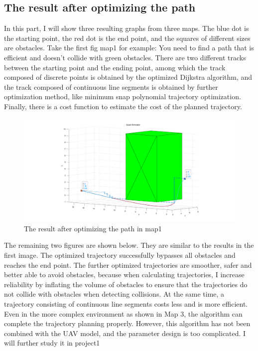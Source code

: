 \documentclass[12pt]{article}
\begin{document}
\subsection{The result after optimizing the path}
In this part, I will show three resulting graphs from three maps. The blue dot is the starting point, the red dot is the end point, and the squares of different sizes are obstacles.
Take the first fig map1 for example: You need to find a path that is efficient and doesn't collide with green obstacles.
There are two different tracks between the starting point and the ending point, among which the track composed of discrete points is obtained by the optimized Dijkstra algorithm, and the track composed of continuous line segments is obtained by further optimization method, like minimum snap polynomial trajectory optimization. Finally, there is a cost function to estimate the cost of the planned trajectory.
\begin{figure}[H]
    \centering
    \includegraphics[width=.8\linewidth]{figures/map1}
    \caption{The result after optimizing the path in map1}
\end{figure}
The remaining two figures are shown below. They are similar to the results in the first image. The optimized trajectory successfully bypasses all obstacles and reaches the end point.
The further optimized trajectories are smoother, safer and better able to avoid obstacles, because when calculating trajectories, I increase reliability by inflating the volume of obstacles to ensure that the trajectories do not collide with obstacles when detecting collisions. At the same time, a trajectory consisting of continuous line segments costs less and is more efficient. Even in the more complex environment as shown in Map 3, the algorithm can complete the trajectory planning properly.
However, this algorithm has not been combined with the UAV model, and the parameter design is too complicated. I will further study it in project1
\end{document}
